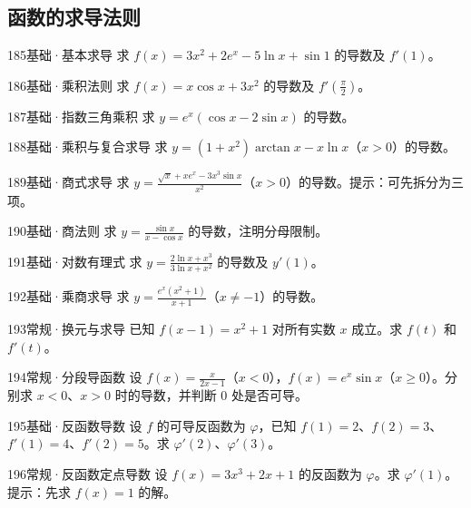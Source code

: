\subsection{函数的求导法则}
\begin{exercise}{185}{基础·基本求导}
求 $f(x)=3x^2+2e^x-5\ln x+\sin1$ 的导数及 $f'(1)$。
\end{exercise}
\begin{exercise}{186}{基础·乘积法则}
求 $f(x)=x\cos x+3x^2$ 的导数及 $f'(\frac{\pi}{2})$。
\end{exercise}
\begin{exercise}{187}{基础·指数三角乘积}
求 $y=e^x(\cos x-2\sin x)$ 的导数。
\end{exercise}
\begin{exercise}{188}{基础·乘积与复合求导}
求 $y=(1+x^2)\arctan x-x\ln x$（$x>0$）的导数。
\end{exercise}
\begin{exercise}{189}{基础·商式求导}
求 $y=\frac{\sqrt x+xe^x-3x^3\sin x}{x^2}$（$x>0$）的导数。提示：可先拆分为三项。
\end{exercise}
\begin{exercise}{190}{基础·商法则}
求 $y=\frac{\sin x}{x-\cos x}$ 的导数，注明分母限制。
\end{exercise}
\begin{exercise}{191}{基础·对数有理式}
求 $y=\frac{2\ln x+x^3}{3\ln x+x^2}$ 的导数及 $y'(1)$。
\end{exercise}
\begin{exercise}{192}{基础·乘商求导}
求 $y=\frac{e^x(x^2+1)}{x+1}$（$x\ne-1$）的导数。
\end{exercise}
\begin{exercise}{193}{常规·换元与求导}
已知 $f(x-1)=x^2+1$ 对所有实数 $x$ 成立。求 $f(t)$ 和 $f'(t)$。
\end{exercise}
\begin{exercise}{194}{常规·分段导函数}
设 $f(x)=\frac{x}{2x-1}$（$x<0$），$f(x)=e^x\sin x$（$x\ge0$）。分别求 $x<0$、$x>0$ 时的导数，并判断 $0$ 处是否可导。
\end{exercise}
\begin{exercise}{195}{基础·反函数导数}
设 $f$ 的可导反函数为 $\varphi$，已知 $f(1)=2$、$f(2)=3$、$f'(1)=4$、$f'(2)=5$。求 $\varphi'(2)$、$\varphi'(3)$。
\end{exercise}
\begin{exercise}{196}{常规·反函数定点导数}
设 $f(x)=3x^3+2x+1$ 的反函数为 $\varphi$。求 $\varphi'(1)$。提示：先求 $f(x)=1$ 的解。
\end{exercise}
